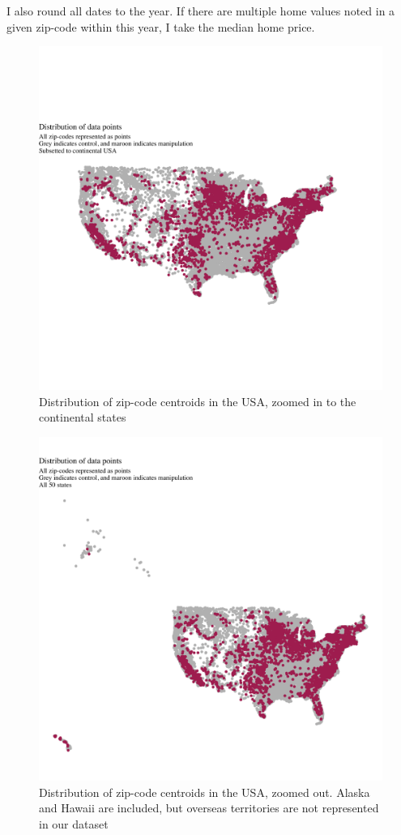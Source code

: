 \documentclass{article}
\begin{document}
I also round all dates to the year.
If there are multiple home values noted in a given zip-code within this year, I take the median home price.

\begin{figure}[h]
\centering
\includegraphics[width=0.9\linewidth]
{zip_code_centroids_continental.png} 
\caption{Distribution of zip-code centroids in the USA, zoomed in to the continental states}
\label{zips_continental}
\end{figure}

\begin{figure}[h]
\centering
\includegraphics[width=0.9\linewidth]
{zip_code_centroids_all.png} 
\caption{Distribution of zip-code centroids in the USA, zoomed out. Alaska and Hawaii are included, but overseas territories are not represented in our dataset}
\label{zips_all}
\end{figure}
\end{document}
